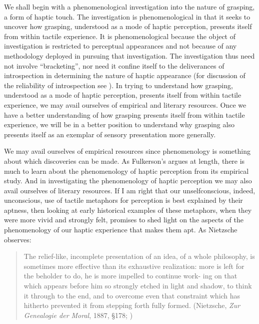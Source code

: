 We shall begin with a phenomenological investigation into the nature of grasping, a form of haptic touch. The investigation is phenomenological in that it seeks to uncover how grasping, understood as a mode of haptic perception, presents itself from within tactile experience. It is phenomenological because the object of investigation is restricted to perceptual appearances and not because of any methodology deployed in pursuing that investigation. The investigation thus need not involve ``bracketing'', nor need it confine itself to the deliverances of introspection in determining the nature of haptic appearance (for discussion of the reliability of introspection see \citealt{Schwitzgebel:2008aa,Bayne:2010ca}). In trying to understand how grasping, understood as a mode of haptic perception, presents itself from within tactile experience, we may avail ourselves of empirical and literary resources. Once we have a better understanding of how grasping presents itself from within tactile experience, we will be in a better position to understand why grasping also presents itself as an exemplar of sensory presentation more generally. 

We may avail ourselves of empirical resources since phenomenology is something about which discoveries can be made.  As Fulkerson's \citeyearpar{Fulkerson:2014ek} argues at length, there is much to learn about the phenomenology of haptic perception from its empirical study.
And in investigating the phenomenology of haptic perception we may also avail ourselves of literary resources. If I am right that our unselfconscious, indeed, unconscious, use of tactile metaphors for perception is best explained by their aptness, then looking at early historical examples of these metaphors, when they were more vivid and strongly felt, promises to shed light on the aspects of the phenomenology of our haptic experience that makes them apt. As Nietzsche observes:
\begin{quote}
	The relief-like, incomplete presentation of an idea, of a whole philosophy, is sometimes more effective than its exhaustive realization: more is left for the beholder to do, he is more impelled to continue work- ing on that which appears before him so strongly etched in light and shadow, to think it through to the end, and to overcome even that constraint which has hitherto prevented it from stepping forth fully formed. (Nietzsche, \emph{Zur Genealogie der Moral}, 1887, §178; \citealt{Smith:1996af})
\end{quote}

